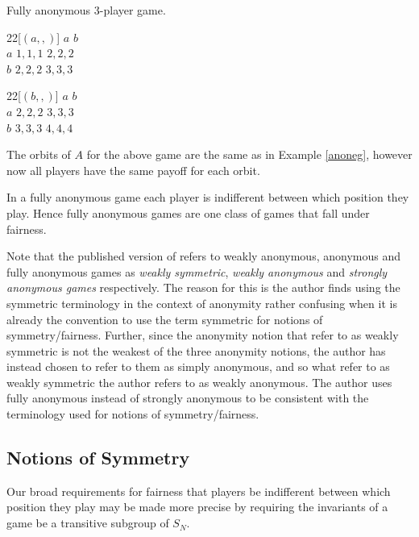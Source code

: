 \begin{example}
		Fully anonymous 3-player game.
		\begin{center}
		\begin{game}{2}{2}[$(a,,)$]
			      \> $a$      \> $b$ \\
			$a$   \> $1,1,1$  \> $2,2,2$ \\
			$b$   \> $2,2,2$  \> $3,3,3$
		\end{game}
		\hspace*{10mm} 
		\begin{game}{2}{2}[$(b,,)$]
			      \> $a$     \> $b$ \\
			$a$   \> $2,2,2$ \> $3,3,3$ \\
			$b$   \> $3,3,3$ \> $4,4,4$
		\end{game}
		\end{center}
		The orbits of $A$ for the above game are the same as in Example \ref{anoneg}, however now all players have the same payoff for each orbit.
	\end{example}
	
In a fully anonymous game each player is indifferent between which position they play. Hence fully anonymous games are one class of games that fall under fairness. 

Note that the published version of \cite{brandt2009symmetries} refers to weakly anonymous, anonymous and fully anonymous games as \textit{weakly symmetric}, \textit{weakly anonymous} and \textit{strongly anonymous games} respectively. The reason for this is the author finds using the symmetric terminology in the context of anonymity rather confusing when it is already the convention to use the term symmetric for notions of symmetry/fairness. Further, since the anonymity notion that \cite{brandt2009symmetries} refer to as weakly symmetric is not the weakest of the three anonymity notions, the author has instead chosen to refer to them as simply anonymous, and so what \cite{brandt2009symmetries} refer to as weakly symmetric the author refers to as weakly anonymous. The author uses fully anonymous instead of strongly anonymous to be consistent with the terminology used for notions of symmetry/fairness.

\subsection{Notions of Symmetry} \label{subsec:labeldepnotionsofsymmetry}
Our broad requirements for fairness that players be indifferent between which position they play may be made more precise by requiring the invariants of a game be a transitive subgroup of $S_N$.

